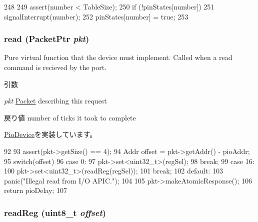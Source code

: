 \begin{DoxyCode}
248 {
249     assert(number < TableSize);
250     if (!pinStates[number])
251         signalInterrupt(number);
252     pinStates[number] = true;
253 }
\end{DoxyCode}
\hypertarget{classX86ISA_1_1I82094AA_a613ec7d5e1ec64f8d21fec78ae8e568e}{
\subsubsection[{read}]{ read ({\bf PacketPtr} {\em pkt})}}
\label{classX86ISA_1_1I82094AA_a613ec7d5e1ec64f8d21fec78ae8e568e}
Pure virtual function that the device must implement. Called when a read command is recieved by the port. 
\begin{DoxyParams}{引数}
\item[{\em pkt}]\hyperlink{classPacket}{Packet} describing this request \end{DoxyParams}
\begin{DoxyReturn}{戻り値}
number of ticks it took to complete 
\end{DoxyReturn}


\hyperlink{classPioDevice_a842312590432036092c422c87a442358}{PioDevice}を実装しています。


\begin{DoxyCode}
92 {
93     assert(pkt->getSize() == 4);
94     Addr offset = pkt->getAddr() - pioAddr;
95     switch(offset) {
96       case 0:
97         pkt->set<uint32_t>(regSel);
98         break;
99       case 16:
100         pkt->set<uint32_t>(readReg(regSel));
101         break;
102       default:
103         panic("Illegal read from I/O APIC.\n");
104     }
105     pkt->makeAtomicResponse();
106     return pioDelay;
107 }
\end{DoxyCode}
\hypertarget{classX86ISA_1_1I82094AA_a2e9f685c7a9db218d1bb3db976b98e9c}{
\subsubsection[{readReg}]{ readReg (uint8\_\-t {\em offset})}}
\label{classX86ISA_1_1I82094AA_a2e9f685c7a9db218d1bb3db976b98e9c}



